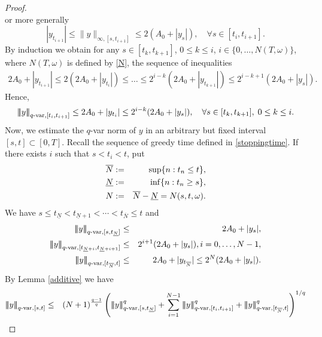 \documentclass[10pt]{article}
\numberwithin{equation}{section} %
\newcommand{\ltn}{\ensuremath{\left| \! \left| \! \left|}}
\newcommand{\rtn}{\ensuremath{\right| \! \right| \! \right|}}
\begin{document}
\begin{proof}
$$$$
or more generally
\begin{equation}
|y_{t_{i+1}}|\leq  \|y\|_{\infty,[s,t_{i+1}]}\leq 2(A_0+|y_{s}|), \quad \forall s\in [t_i,t_{i+1}].
\end{equation}
By induction we obtain for any $s\in [t_k,t_{k+1}]$, $0\leq k\leq i$, $i\in \{0,\dots , N(T,\omega)\}$,  where $N(T,\omega)$ is defined by \eqref{N}, the sequence of inequalities
\begin{eqnarray}\label{induction}
2A_0+ | y_{t_{i+1}}|\leq  2(2A_0+ |y_{t_i}|)\leq \dots \leq 2^{i-k}(2A_0+|y_{t_{k+1}}|)\leq 2^{i-k+1}(2A_0+|y_{s}|).%
\end{eqnarray}
Hence, 
\begin{eqnarray}
\ltn y\rtn_{q\text{-var},[t_i,t_{i+1}]} \leq 2A_0+ | y_{t_{i}}|\leq 2^{i-k}(2A_0+|y_{s}|),\quad \forall s\in [t_k,t_{k+1}],\;0\leq k\leq i.
\end{eqnarray}
Now, we estimate the $q$-var norm of $y$ in an arbitrary but fixed interval $[s,t]\subset[0,T]$. Recall the sequence of greedy time defined in \eqref{stoppingtime}. If there exists $i$ such that $s<t_i<t$, put
\begin{eqnarray}
\overline{N}&:=& \sup\{n: t_n\leq t\},\notag\\
\underline{N}&:=& \inf\{n: t_n\geq s\},\label{N-barN}\\
N&:=&  \overline{N}- \underline{N}=N(s,t,\omega). \notag
\end{eqnarray}
We have $s\leq t_{\underline{N}}<t_{\underline{N}+1} <\cdots < t_{\overline{N}}\leq t$ and
\begin{eqnarray*}
\ltn y\rtn_{q\text{-var},[s,t_{\underline{N}}]}&\leq & 2A_0 + |y_s|,\\
\ltn y\rtn_{q\text{-var},[t_{\underline{N}+i},t_{\underline{N}+i+1}]}&\leq & 2^{i+1}( 2A_0 + |y_{s}|), i=0,\dots , N-1,\\
\ltn y\rtn_{q\text{-var},[t_{\overline{N}},t]}&\leq & 2A_0+|y_{t_{\overline{N}}}| \leq 2^{N}( 2A_0 + |y_{s}|).
\end{eqnarray*}
By Lemma \ref{additive} we have
 \begin{eqnarray}
\ltn y\rtn_{q\text{-var},[s,t]}&\leq& (N+1)^{\frac{q-1}{q}} \left(\ltn y\rtn^q_{q\text{-var},[s,t_{\underline{N}}]}+ \sum_{i=1}^{N-1}\ltn y\rtn^q_{q\text{-var},[t_i,t_{i+1}]} + \ltn y\rtn^q_{q\text{-var},[t_{\overline{N}},t]} \right)^{1/q}\nonumber\\

\end{eqnarray}
\end{proof}
\end{document}
